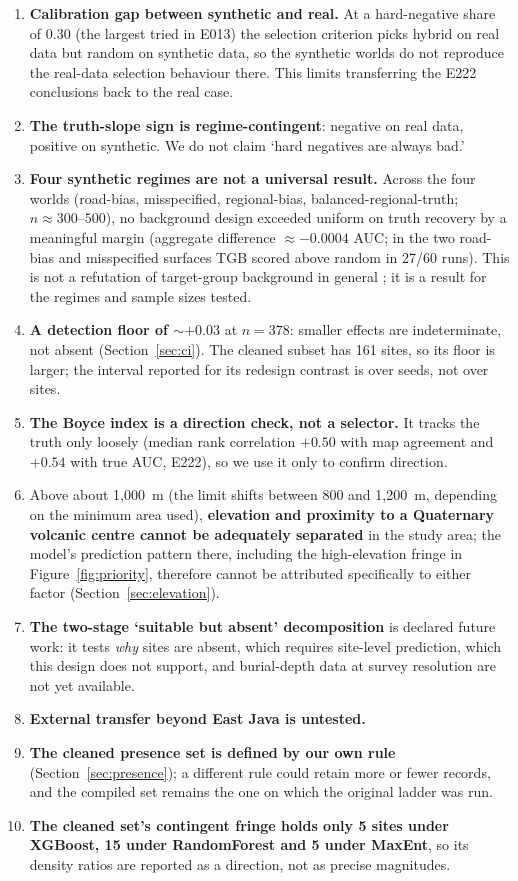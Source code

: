 \documentclass[12pt]{article}
\begin{document}
\begin{enumerate}
  \item \textbf{Calibration gap between synthetic and real.} At a hard-negative share of 0.30 (the largest tried in E013) the selection criterion picks hybrid on real data but random on synthetic data, so the synthetic worlds do not reproduce the real-data selection behaviour there. This limits transferring the E222 conclusions back to the real case.
  \item \textbf{The truth-slope sign is regime-contingent}: negative on real data, positive on synthetic. We do not claim `hard negatives are always bad.'
  \item \textbf{Four synthetic regimes are not a universal result.} Across the four worlds (road-bias, misspecified, regional-bias, balanced-regional-truth; $n \approx 300$--$500$), no background design exceeded uniform on truth recovery by a meaningful margin (aggregate difference $\approx -0.0004$ AUC; in the two road-bias and misspecified surfaces TGB scored above random in 27/60 runs). This is not a refutation of target-group background in general \citep{phillips2009}; it is a result for the regimes and sample sizes tested.
  \item \textbf{A detection floor of $\sim +0.03$} at $n=378$: smaller effects are indeterminate, not absent (Section~\ref{sec:ci}). The cleaned subset has 161 sites, so its floor is larger; the interval reported for its redesign contrast is over seeds, not over sites.
  \item \textbf{The Boyce index is a direction check, not a selector.} It tracks the truth only loosely (median rank correlation $+0.50$ with map agreement and $+0.54$ with true AUC, E222), so we use it only to confirm direction.
  \item Above about 1,000~m (the limit shifts between 800 and 1,200~m, depending on the minimum area used), \textbf{elevation and proximity to a Quaternary volcanic centre cannot be adequately separated} in the study area; the model's prediction pattern there, including the high-elevation fringe in Figure~\ref{fig:priority}, therefore cannot be attributed specifically to either factor (Section~\ref{sec:elevation}).
  \item \textbf{The two-stage `suitable but absent' decomposition} is declared future work: it tests \emph{why} sites are absent, which requires site-level prediction, which this design does not support, and burial-depth data at survey resolution are not yet available.
  \item \textbf{External transfer beyond East Java is untested.}
  \item \textbf{The cleaned presence set is defined by our own rule} (Section~\ref{sec:presence}); a different rule could retain more or fewer records, and the compiled set remains the one on which the original ladder was run.
  \item \textbf{The cleaned set's contingent fringe holds only 5 sites under XGBoost, 15 under RandomForest and 5 under MaxEnt}, so its density ratios are reported as a direction, not as precise magnitudes.
\end{enumerate}
\end{document}
